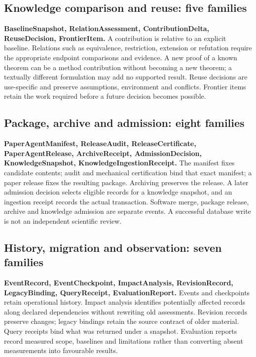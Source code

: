 \subsection{Knowledge comparison and reuse: five families}

\textbf{BaselineSnapshot, RelationAssessment, ContributionDelta, ReuseDecision, FrontierItem.} A contribution is relative to an explicit baseline. Relations such as equivalence, restriction, extension or refutation require the appropriate endpoint comparisons and evidence. A new proof of a known theorem can be a method contribution without becoming a new theorem; a textually different formulation may add no supported result. Reuse decisions are use-specific and preserve assumptions, environment and conflicts. Frontier items retain the work required before a future decision becomes possible.

\subsection{Package, archive and admission: eight families}

\textbf{PaperAgentManifest, ReleaseAudit, ReleaseCertificate, PaperAgentRelease, ArchiveReceipt, AdmissionDecision, KnowledgeSnapshot, KnowledgeIngestionReceipt.} The manifest fixes candidate contents; audit and mechanical certification bind that exact manifest; a paper release fixes the resulting package. Archiving preserves the release. A later admission decision selects eligible records for a knowledge snapshot, and an ingestion receipt records the actual transaction. Software merge, package release, archive and knowledge admission are separate events. A successful database write is not an independent scientific review.

\subsection{History, migration and observation: seven families}

\textbf{EventRecord, EventCheckpoint, ImpactAnalysis, RevisionRecord, LegacyBinding, QueryReceipt, EvaluationReport.} Events and checkpoints retain operational history. Impact analysis identifies potentially affected records along declared dependencies without rewriting old assessments. Revision records preserve changes; legacy bindings retain the source contract of older material. Query receipts bind what was returned under a snapshot. Evaluation reports record measured scope, baselines and limitations rather than converting absent measurements into favourable results.


